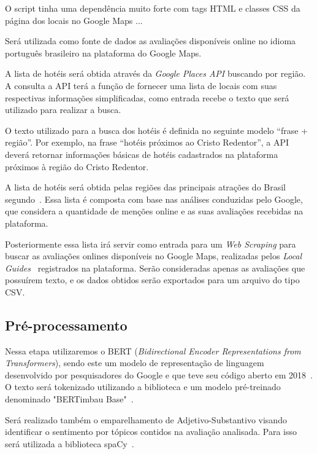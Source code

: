 O script tinha uma dependência muito forte com tags HTML e classes CSS da página dos locais no Google Maps ...

Será utilizada como fonte de dados as avaliações disponíveis online no idioma português brasileiro na plataforma do Google Maps.

A lista de hotéis será obtida através da \emph{Google Places API} buscando por região. A consulta a API terá a função de fornecer uma lista de locais com suas respectivas informações simplificadas, como entrada recebe o texto que será utilizado para realizar a busca.

O texto utilizado para a busca dos hotéis é definida no seguinte modelo “frase + região”. Por exemplo, na frase “hotéis próximos ao Cristo Redentor”, a API deverá retornar informações básicas de hotéis cadastrados na plataforma próximos à região do Cristo Redentor.

A lista de hotéis será obtida pelas regiões das principais atrações do Brasil segundo~\cite{googleFlights2022destinos}. Essa lista é composta com base nas análises conduzidas pelo Google, que considera a quantidade de menções online e as suas avaliações recebidas na plataforma.

Posteriormente essa lista irá servir como entrada para um \emph{Web Scraping} para buscar as avaliações onlines disponíveis no Google Maps, realizadas pelos \emph{Local Guides}~\cite{google2022localguides} registrados na plataforma. Serão consideradas apenas as avaliações que possuírem texto, e os dados obtidos serão exportados para um arquivo do tipo CSV.


\subsection{Pré-processamento}
\label{subsec:pre_processamento}


Nessa etapa utilizaremos o BERT (\emph{Bidirectional Encoder Representations from Transformers}), sendo este um modelo de representação de linguagem desenvolvido por pesquisadores do Google e que teve seu código aberto em 2018~\cite{hugoZanini2021mediu}. O texto será tokenizado utilizando a biblioteca e um modelo pré-treinado denominado "BERTimbau Base"~\cite{souza2020bertimbau}.

Será realizado também o emparelhamento de Adjetivo-Substantivo visando identificar o sentimento por tópicos contidos na avaliação analisada. Para isso será utilizada a biblioteca spaCy~\cite{montani2022spacy}. 

